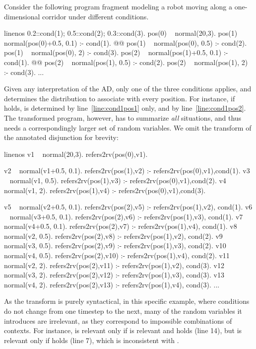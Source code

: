 \begin{example}
	Consider the following program fragment modeling a robot moving along a one-dimensional corridor under different conditions.
	\begin{problog*}{linenos}
0.2::cond(1); 0.5::cond(2); 0.3::cond(3).
pos(0) ~ normal(20,3).
pos(1) ~ normal(pos(0)+0.5, 0.1) :- cond(1). @\label{line:cond1pos1}@
pos(1) ~ normal(pos(0), 0.5) :- cond(2).
pos(1) ~ normal(pos(0), 2) :- cond(3).
pos(2) ~ normal(pos(1)+0.5, 0.1) :- cond(1). @\label{line:cond1pos2}@
pos(2) ~ normal(pos(1), 0.5) :- cond(2).
pos(2) ~ normal(pos(1), 2) :- cond(3).
...
	\end{problog*}
	Given any interpretation of the AD, only one of the three conditions applies, and determines the distribution to associate with every position. For instance, if  holds,  is determined by line~\ref{line:cond1pos1} only, and  by line~\ref{line:cond1pos2}.  The transformed program, however, has to summarize \emph{all} situations, and thus needs a correspondingly larger set of random variables. We omit the transform of the annotated disjunction for brevity:
	\begin{problog*}{linenos}
v1 ~ normal(20,3).
refers2rv(pos(0),v1).

v2 ~ normal(v1+0.5, 0.1).
refers2rv(pos(1),v2) :- refers2rv(pos(0),v1),cond(1).
v3 ~ normal(v1, 0.5).
refers2rv(pos(1),v3) :- refers2rv(pos(0),v1),cond(2).
v4 ~ normal(v1, 2).
refers2rv(pos(1),v4) :- refers2rv(pos(0),v1),cond(3).

v5 ~ normal(v2+0.5, 0.1).
refers2rv(pos(2),v5) :- refers2rv(pos(1),v2), cond(1).
v6 ~ normal(v3+0.5, 0.1).
refers2rv(pos(2),v6) :- refers2rv(pos(1),v3), cond(1).
v7 ~ normal(v4+0.5, 0.1).
refers2rv(pos(2),v7) :- refers2rv(pos(1),v4), cond(1).
v8 ~ normal(v2, 0.5).
refers2rv(pos(2),v8) :- refers2rv(pos(1),v2), cond(2).
v9 ~ normal(v3, 0.5).
refers2rv(pos(2),v9) :- refers2rv(pos(1),v3), cond(2).
v10 ~ normal(v4, 0.5).
refers2rv(pos(2),v10) :- refers2rv(pos(1),v4), cond(2).
v11 ~ normal(v2, 2).
refers2rv(pos(2),v11) :- refers2rv(pos(1),v2), cond(3).
v12 ~ normal(v3, 2).
refers2rv(pos(2),v12) :- refers2rv(pos(1),v3), cond(3).
v13 ~ normal(v4, 2).
refers2rv(pos(2),v13) :- refers2rv(pos(1),v4), cond(3).
...
	\end{problog*}
	As the transform is purely syntactical, in this specific example, where conditions do not change from one timestep to the next, many of the random variables it introduces are irrelevant, as they correspond to impossible combinations of contexts. For instance,  is relevant only if  is relevant and  holds (line 14), but  is relevant only if  holds (line 7), which is inconsistent with . 
\end{example}

